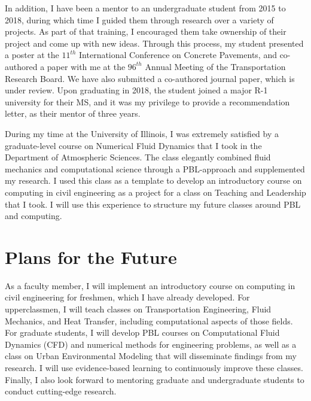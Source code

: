 \documentclass[12pt]{article}
\begin{document}
In addition, I have been a mentor to an undergraduate student from 2015 to 2018, during which time I guided them through research over a variety of projects. As part of that training, I encouraged them take ownership of their project and come up with new ideas. Through this process, my student presented a poster at the $11^{th}$ International Conference on Concrete Pavements, and co-authored a paper with me at the $96^{th}$ Annual Meeting of the Transportation Research Board. We have also submitted a co-authored journal paper, which is under review. Upon graduating in 2018, the student joined a major R-1 university for their MS, and it was my privilege to provide a recommendation letter, as their mentor of three years.

During my time at the University of Illinois, I was extremely satisfied by a graduate-level course on Numerical Fluid Dynamics that I took in the Department of Atmospheric Sciences. The class elegantly combined fluid mechanics and computational science through a PBL-approach and supplemented my research. I used this class as a template to develop an introductory course on computing in civil engineering as a project for a class on Teaching and Leadership that I took. I will use this experience to structure my future classes around PBL and computing. 

\section*{Plans for the Future}
As a faculty member, I will implement an introductory course on computing in civil engineering for freshmen, which I have already developed. For upperclassmen, I will teach classes on Transportation Engineering, Fluid Mechanics, and Heat Transfer, including computational aspects of those fields. For graduate students, I will develop PBL courses on Computational Fluid Dynamics (CFD) and numerical methods for engineering problems, as well as a class on Urban Environmental Modeling that will disseminate findings from my research. I will use evidence-based learning to continuously improve these classes. Finally, I also look forward to mentoring graduate and undergraduate students to conduct cutting-edge research.

 

\end{document}
